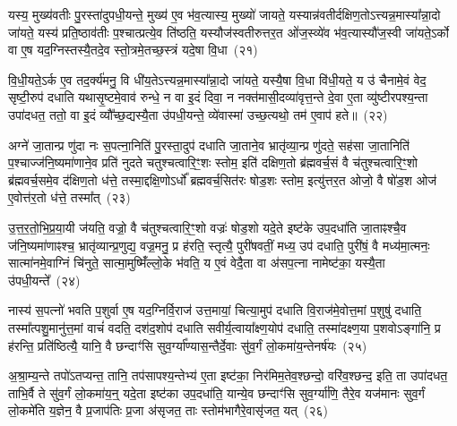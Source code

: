 यस्य॒ मुख्य॑वतीः पु॒रस्ता॑दुपधी॒यन्ते॒ मुख्य॑ ए॒व भ॑व॒त्यास्य॒ मुख्यो॑ जायते॒ यस्यान्न॑वतीर्दक्षिण॒तो\-ऽत्त्यन्न॒मास्या᳚न्ना॒दो जा॑यते॒ यस्य॑ प्रति॒ष्ठाव॑तीः प॒श्चात्प्रत्ये॒व ति॑ष्ठति॒ यस्यौज॑स्वतीरुत्तर॒त ओ॑ज॒स्व्ये॑व भ॑व॒त्यास्यौ॑ज॒स्वी जा॑यते॒\-ऽर्को वा ए॒ष यद॒ग्निस्तस्यै॒तदे॒व स्तो॒त्रमे॒तच्छ॒स्त्रं यदे॒षा वि॒धा~(२१)

वि॒धी॒यते॒\-ऽर्क ए॒व तद॒र्क्य॑मनु॒ वि धी॑य॒ते\-ऽत्त्यन्न॒मास्या᳚न्ना॒दो जा॑यते॒ यस्यै॒षा वि॒धा वि॑धी॒यते॒ य उ॑ चैनामे॒वं वेद॒ सृष्टी॒रुप॑ दधाति यथासृ॒ष्टमे॒वाव॑ रुन्धे॒ न वा इ॒दं दिवा॒ न नक्त॑मासी॒दव्या॑वृत्त॒न्ते दे॒वा ए॒ता व्यु॑ष्टीरपश्य॒न्ता उपा॑दधत॒ ततो॒ वा इ॒दं व्यौ᳚च्छ॒द्यस्यै॒ता उ॑पधी॒यन्ते॒ व्ये॑वास्मा॑ उच्छ॒त्यथो॒ तम॑ ए॒वाप॑ हते॥~(२२)

{\anuvakamend[{वै ज॒नित्रं॑ पञ्चद॒शो\-ऽदि॑त्यै भा॒गो वै ध॒र्त्रः स॒माव॑द्वीर्यौ वि॒धा ततो॒ वा इ॒दं चतु॑र्दश च}]}%

अग्ने॑ जा॒तान्प्र णु॑दा नः स॒पत्ना॒निति॑ पु॒रस्ता॒दुप॑ दधाति जा॒ताने॒व भ्रातृ॑व्या॒न्प्र णु॑दते॒ सह॑सा जा॒तानिति॑ प॒श्चाज्ज॑नि॒ष्यमा॑णाने॒व प्रति॑ नुदते चतुश्चत्वारि॒ꣳ॒शः स्तोम॒ इति॑ दक्षिण॒तो ब्र॑ह्मवर्च॒सं वै च॑तुश्चत्वारि॒ꣳ॒शो ब्र॑ह्मवर्च॒समे॒व द॑क्षिण॒तो ध॑त्ते॒ तस्मा॒द्दक्षि॒णो\-ऽर्धो᳚ ब्रह्मवर्च॒सित॑रः षोड॒शः स्तोम॒ इत्यु॑त्तर॒त ओजो॒ वै षो॑ड॒श ओज॑ ए॒वोत्त॑र॒तो ध॑त्ते॒ तस्मा᳚त्~(२३)

उ॒त्त॒र॒तो॒भि॒प्र॒या॒यी ज॑यति॒ वज्रो॒ वै च॑तुश्चत्वारि॒ꣳ॒शो वज्रः॑ षोड॒शो यदे॒ते इष्ट॑के उप॒दधा॑ति जा॒ताꣴश्चै॒व ज॑नि॒ष्यमा॑णाꣴश्च॒ भ्रातृ॑व्यान्प्र॒णुद्य॒ वज्र॒मनु॒ प्र ह॑रति॒ स्तृत्यै॒ पुरी॑षवतीं॒ मध्य॒ उप॑ दधाति॒ पुरी॑षं॒ वै मध्य॑मा॒त्मनः॒ सात्मा॑नमे॒वाग्निं चि॑नुते॒ सात्मा॒मुष्मिँ॑ल्लो॒के भ॑वति॒ य ए॒वं वेदै॒ता वा अ॑सप॒त्ना नामेष्ट॑का॒ यस्यै॒ता उ॑पधी॒यन्ते᳚~(२४)

नास्य॑ स॒पत्नो॑ भवति प॒शुर्वा ए॒ष यद॒ग्निर्वि॒राज॑ उत्त॒मायां॒ चित्या॒मुप॑ दधाति वि॒राज॑मे॒वोत्त॒मां प॒शुषु॑ दधाति॒ तस्मा᳚त्पशु॒मानु॑त्त॒मां वाचं॑ वदति॒ दश॑द॒शोप॑ दधाति सवीर्य॒\-त्वा\-या᳚क्ष्ण॒\-योप॑ दधाति॒ तस्मा॑दक्ष्ण॒या प॒शवो\-ऽङ्गा॑नि॒ प्र ह॑रन्ति॒ प्रति॑ष्ठित्यै॒ यानि॒ वै छन्दाꣳ॑सि सुव॒र्ग्या᳚ण्यास॒न्तैर्दे॒वाः सु॑व॒र्गं लो॒कमा॑य॒न्तेनर्\mbox{}ष॑यः~(२५)

अ॒श्रा॒म्य॒न्ते तपो॑\-ऽतप्यन्त॒ तानि॒ तप॑सापश्य॒न्तेभ्य॑ ए॒ता इष्ट॑का॒ निर॑मिम॒तेव॒श्छन्दो॒ वरि॑व॒श्छन्द॒ इति॒ ता उपा॑दधत॒ ताभि॒र्वै ते सु॑व॒र्गं लो॒कमा॑य॒न्॒ यदे॒ता इष्ट॑का उप॒दधा॑ति॒ यान्ये॒व छन्दाꣳ॑सि सुव॒र्ग्या॑णि॒ तैरे॒व यज॑मानः सुव॒र्गं लो॒कमे॑ति य॒ज्ञेन॒ वै प्र॒जा\-प॑तिः प्र॒जा अ॑सृजत॒ ताः स्तोम॑भागैरे॒वासृ॑जत॒ यत्~(२६)

